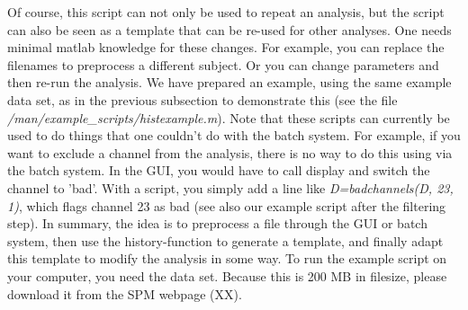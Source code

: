 Of course, this script can not only be used to repeat an analysis, but the script can also be seen as a template that can be re-used for other analyses. One needs minimal matlab knowledge for these changes. For example, you can replace the filenames to preprocess a different subject. Or you can change parameters and then re-run the analysis. We have prepared an example, using the same example data set, as in the previous subsection to demonstrate this (see the file \textit{/man/example\_scripts/histexample.m}). Note that these scripts can currently be used to do things that one couldn't do with the batch system. For example, if you want to exclude a channel from the analysis, there is no way to do this using via the batch system. In the GUI, you would have to call display and switch the channel to 'bad'. With a script, you simply add a line like \textit{D=badchannels(D, 23, 1)}, which flags channel 23 as bad (see also our example script after the filtering step). In summary, the idea is to preprocess a file through the GUI or batch system, then use the history-function to generate a template, and finally adapt this template to modify the analysis in some way. To run the example script on your computer, you need the data set. Because this is 200 MB in filesize, please download it from the SPM webpage (XX).